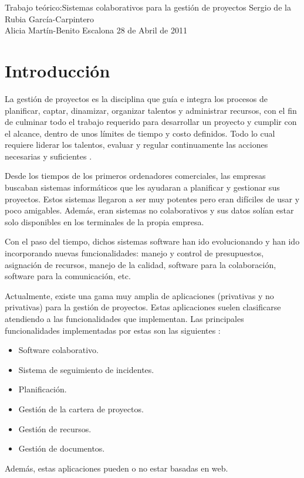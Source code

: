 \documentclass[11pt,a4paper,spanish,twoside]{report}
\begin{document}


{Trabajo teórico:}{Sistemas colaborativos para la gestión de proyectos}
{Sergio de la Rubia García-Carpintero\\Alicia Martín-Benito Escalona}
{28 de Abril de 2011}


\tableofcontents


\chapter{Introducción}
La gestión de proyectos es la disciplina que guía e integra los procesos de
planificar, captar, dinamizar, organizar talentos y administrar recursos, con
el fin de culminar todo el trabajo requerido para desarrollar un proyecto y
cumplir con el alcance, dentro de unos límites de tiempo y costo definidos.
Todo lo cual requiere liderar los talentos, evaluar y regular continuamente
las acciones necesarias y suficientes \cite{GPR}.

Desde los tiempos de los primeros ordenadores comerciales, las empresas
buscaban sistemas informáticos que les ayudaran a planificar y gestionar sus
proyectos. Estos sistemas llegaron a ser muy potentes pero eran difíciles de
usar y poco amigables. Además, eran sistemas no colaborativos y sus datos
solían estar solo disponibles en los terminales de la propia empresa.

Con el paso del tiempo, dichos sistemas software han ido evolucionando y han
ido incorporando nuevas funcionalidades: manejo y control de presupuestos,
asignación de recursos, manejo de la calidad, software para la colaboración,
software para la comunicación, etc.

Actualmente, existe una gama muy amplia de aplicaciones (privativas y no
privativas) para la gestión de proyectos. Estas aplicaciones suelen
clasificarse atendiendo a las funcionalidades que implementan. Las principales
funcionalidades implementadas por estas son las siguientes \cite{WPM}:
\begin{itemize}
	\item Software colaborativo.
	\item Sistema de seguimiento de incidentes.
	\item Planificación.
	\item Gestión de la cartera de proyectos.
	\item Gestión de recursos.
	\item Gestión de documentos.
\end{itemize}
Además, estas aplicaciones pueden o no estar basadas en web.
\end{document}
